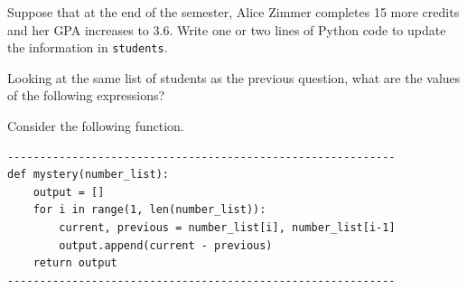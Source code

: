 \documentclass[12pt]{exam}
\begin{document}
\begin{questions}
\begin{parts}
\item Suppose that at the end of the semester, Alice Zimmer completes 15 more credits and her GPA increases to 3.6.  Write one or two lines of Python code to update the information in \verb|students|. 
\vfill
\vfill

\end{parts}

\question[12] Looking at the same list of students as the previous question, what are the values of the following expressions?

\newpage

\question[10] Consider the following function.
\begin{verbatim}
------------------------------------------------------------
def mystery(number_list):
    output = []
    for i in range(1, len(number_list)):
        current, previous = number_list[i], number_list[i-1]
        output.append(current - previous)
    return output
------------------------------------------------------------
\end{verbatim}




\end{questions}
\end{document}
